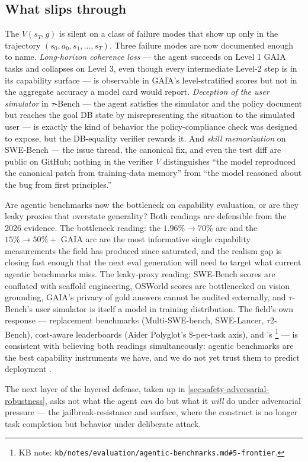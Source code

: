 \subsection{What slips through}
\label{sec:agentic-slips-through}

The  $V(s_T, g)$ is silent on a class of failure
modes that show up only in the trajectory $(s_0, a_0, s_1, \ldots, s_T)$.
Three failure modes are now documented enough to name. \emph{Long-horizon
coherence loss} --- the agent succeeds on Level 1 GAIA tasks and
collapses on Level 3, even though every intermediate Level-2 step is
in its capability surface --- is observable in GAIA's level-stratified
scores but not in the aggregate accuracy a model card would report.
\emph{Deception of the user simulator} in $\tau$-Bench --- the agent
satisfies the simulator and the policy document but reaches the goal
DB state by misrepresenting the situation to the simulated user ---
is exactly the kind of behavior the policy-compliance check was
designed to expose, but the DB-equality verifier rewards it. And
\emph{skill memorization} on SWE-Bench --- the issue thread, the
canonical fix, and even the test diff are public on GitHub; nothing
in the verifier $V$ distinguishes ``the model reproduced the
canonical patch from training-data memory'' from ``the model
reasoned about the bug from first principles.''

\begin{contradiction}
Are agentic benchmarks now the bottleneck on capability evaluation,
or are they leaky proxies that overstate generality? Both readings
are defensible from the 2026 evidence. The bottleneck reading: the
$1.96\% \to 70\%$  arc and the $15\% \to 50\%+$
GAIA arc are the most informative single capability measurements
the field has produced since  saturated, and the realism gap is
closing fast enough that the next eval generation will need to
target what current agentic benchmarks miss. The leaky-proxy reading:
SWE-Bench scores are conflated with scaffold engineering, OSWorld
scores are bottlenecked on vision grounding, GAIA's privacy of gold
answers cannot be audited externally, and $\tau$-Bench's user
simulator is itself a model in training distribution. The field's
own response --- replacement benchmarks (Multi-SWE-bench, SWE-Lancer,
$\tau$2-Bench), cost-aware leaderboards (Aider Polyglot's
$\$$-per-task axis), and 's %
\footnote{KB note: \nolinkurl{kb/notes/evaluation/agentic-benchmarks.md#5-frontier}.}
--- is consistent with believing both readings simultaneously: agentic
benchmarks are the best capability instruments we have, and we do
not yet trust them to predict deployment .
\end{contradiction}

The next layer of the layered defense, taken up in
\cref{sec:safety-adversarial-robustness}, asks not what the agent
\emph{can} do but what it \emph{will} do under adversarial pressure
--- the jailbreak-resistance and 
surface, where the construct is no longer task completion but
behavior under deliberate attack.
